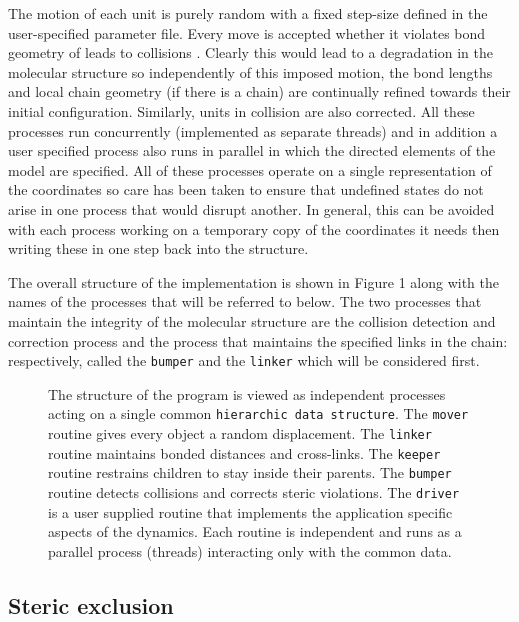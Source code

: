 The motion of each unit is purely random with a fixed step-size
defined in the user-specified parameter file.  Every move is
accepted whether it violates bond geometry of leads to collisions
\cite{KatsimitsouliaZet10a}.
Clearly this would lead to a degradation in the molecular structure
so independently of this imposed motion, the bond lengths and local
chain geometry (if there is a chain) are continually refined towards
their initial configuration.  Similarly, units in collision are
also corrected.   All these processes run concurrently (implemented
as separate threads) and in addition a user specified process
also runs in parallel in which the directed elements of the model
are specified.   All of these processes operate on a single
representation of the coordinates so care has been taken to ensure
that undefined states do not arise in one process that would 
disrupt another.  In general, this can be avoided with each 
process working on a temporary copy of the coordinates it needs
then writing these in one step back into the structure.

The overall structure of the implementation is shown in Figure 1 along
with the names of the processes that will be referred to below.
The two processes that maintain the integrity of the molecular structure
are the collision detection and correction process and the process that
maintains the specified links in the chain: respectively, called the 
{\tt bumper} and the {\tt linker} which will be considered first.

\begin{figure}
\centering
\epsfxsize=300pt 
\caption{
\label{Fig:control}
The structure of the program is viewed as independent processes acting
on a single common {\tt hierarchic data structure}. 
The {\tt mover} routine gives every object a random displacement. 
The {\tt linker} routine maintains bonded distances and cross-links. 
The {\tt keeper} routine restrains children to stay inside their parents.
The {\tt bumper} routine detects collisions and corrects steric violations.
The {\tt driver} is a user supplied routine that implements the application
specific aspects of the dynamics.   Each routine is independent and runs
as a parallel process (threads) interacting only with the common data.
}
\end{figure}

\subsection{Steric exclusion}

